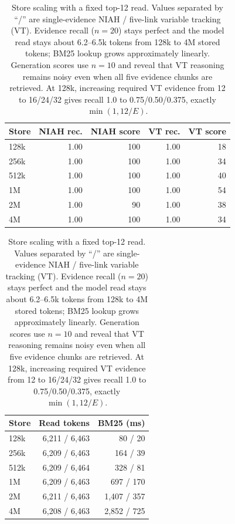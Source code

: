 \begin{table}[t]
\centering
\small
\setlength{\tabcolsep}{3pt}
\begin{tabular}{@{}lrrrr@{}}
\toprule
\textbf{Store} & \textbf{NIAH rec.} & \textbf{NIAH score} &
\textbf{VT rec.} & \textbf{VT score} \\
\midrule
128k & 1.00 & 100 & 1.00 & 18 \\
256k & 1.00 & 100 & 1.00 & 34 \\
512k & 1.00 & 100 & 1.00 & 40 \\
1M   & 1.00 & 100 & 1.00 & 54 \\
2M   & 1.00 & 90  & 1.00 & 38 \\
4M   & 1.00 & 100 & 1.00 & 34 \\
\bottomrule
\end{tabular}

\vspace{3pt}
\begin{tabular}{@{}lrr@{}}
\toprule
\textbf{Store} & \textbf{Read tokens} & \textbf{BM25 (ms)} \\
\midrule
128k & 6,211 / 6,463 & 80 / 20 \\
256k & 6,209 / 6,463 & 164 / 39 \\
512k & 6,209 / 6,464 & 328 / 81 \\
1M   & 6,209 / 6,463 & 697 / 170 \\
2M   & 6,211 / 6,463 & 1,407 / 357 \\
4M   & 6,208 / 6,463 & 2,852 / 725 \\
\bottomrule
\end{tabular}
\caption{Store scaling with a fixed top-12 read. Values separated by ``/'' are
single-evidence NIAH / five-link variable tracking (VT). Evidence recall
($n{=}20$) stays perfect and the model read stays about 6.2--6.5k tokens from
128k to 4M stored tokens; BM25 lookup grows approximately linearly. Generation
scores use $n{=}10$ and reveal that VT reasoning remains noisy even when all
five evidence chunks are retrieved. At 128k, increasing required VT evidence
from 12 to 16/24/32 gives recall 1.0 to 0.75/0.50/0.375, exactly
$\min(1,12/E)$.}
\label{tab:store-scaling}
\end{table}
